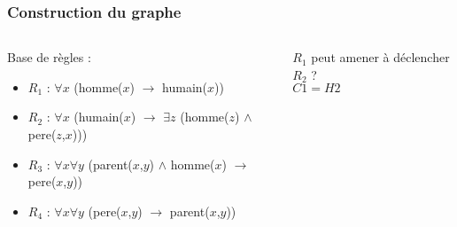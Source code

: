 \begin{frame}
	\frametitle{Construction du graphe}
	\begin{columns}
	\begin{column}{0.55\linewidth}
		Base de règles :
		\begin{itemize}
			\item $R_1$ : $\forall x$ (homme($x$) $\rightarrow$ humain($x$))
			\item $R_2$ : $\forall x$ (humain($x$) $\rightarrow$ $\exists z$ (homme($z$)
			$\wedge$ pere($z$,$x$)))
			\item $R_3$ : $\forall x \forall y$ (parent($x$,$y$) $\wedge$ homme($x$)
			$\rightarrow$ pere($x$,$y$))
			\item $R_4$ : $\forall x \forall y$ (pere($x$,$y$) $\rightarrow$
			parent($x$,$y$))
		\end{itemize}
	\end{column}
	\vline
	\hfill
	\begin{column}{0.35\linewidth}
		\begin{center}
			$R_1$ peut amener à déclencher $R_2$ ?\\
			$C1 = H2$
		\end{center}
		\begin{figure}
		\end{figure}
	\end{column}
	\end{columns}
\end{frame}

